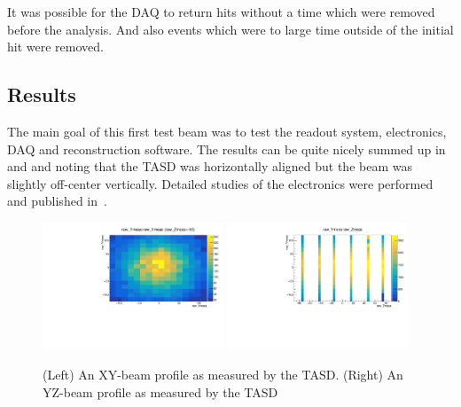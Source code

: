 It was possible for the DAQ to return hits without a time which were removed before the analysis. And also events which were to large time outside of the initial hit were removed.

\subsection{Results}

The main goal of this first test beam was to test the readout system, electronics, DAQ and reconstruction software. The results can be quite nicely summed up in  and  and noting that the TASD was horizontally aligned but the beam was slightly off-center vertically. Detailed studies of the electronics were performed and published in~\cite{52Georgi}.


\begin{figure}[h!]
\centering
\includegraphics[width=0.48\textwidth]{figures/nuphys/newFigures/beamXYplane1Hadron.pdf}
\includegraphics[width=0.48\textwidth]{figures/nuphys/newFigures/beamYZhadron.pdf}
\caption{(Left) An XY-beam profile as measured by the TASD. (Right) An YZ-beam profile as measured by the TASD}
\label{fig:TASDres2}
\end{figure}

